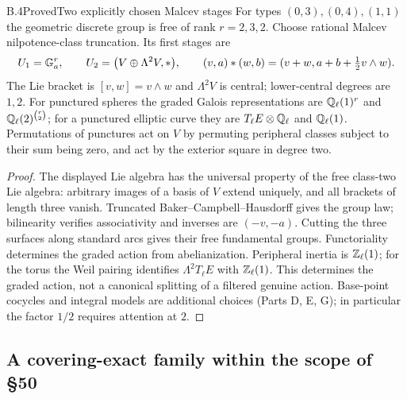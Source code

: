 \begin{statement}{B.4}{Proved}{Two explicitly chosen Malcev stages}
For types $(0,3),(0,4),(1,1)$ the geometric discrete group is
free of rank $r=2,3,2$. Choose rational Malcev nilpotence-class
truncation. Its first stages are
\[
 U_1=\mathbb G_a^r,\qquad
 U_2=\bigl(V\oplus\Lambda^2V,*\bigr),\qquad
 (v,a)*(w,b)=(v+w,a+b+\tfrac12v\wedge w).
\]
The Lie bracket is $[v,w]=v\wedge w$ and $\Lambda^2V$ is central;
lower-central degrees are $1,2$. For punctured spheres the graded
Galois representations are $\mathbb Q_\ell(1)^r$ and
$\mathbb Q_\ell(2)^{\binom r2}$; for a punctured elliptic curve they are
$T_\ell E\otimes\mathbb Q_\ell$ and $\mathbb Q_\ell(1)$. Permutations of punctures
act on $V$ by permuting peripheral classes subject to their sum
being zero, and act by the exterior square in degree two.
\end{statement}
\begin{proof}
The displayed Lie algebra has the universal property of the
free class-two Lie algebra: arbitrary images of a basis of $V$
extend uniquely, and all brackets of length three vanish.
Truncated Baker--Campbell--Hausdorff gives the group law;
bilinearity verifies associativity and inverses are $(-v,-a)$.
Cutting the three surfaces along standard arcs gives their free
fundamental groups. Functoriality determines the graded action
from abelianization. Peripheral inertia is $\mathbb Z_\ell(1)$; for the
torus the Weil pairing identifies $\Lambda^2T_\ell E$ with
$\mathbb Z_\ell(1)$. This determines the graded action, not a canonical
splitting of a filtered genuine action. Base-point cocycles and
integral models are additional choices (Parts D, E, G); in
particular the factor $1/2$ requires attention at $2$.
\end{proof}

\subsection{A covering-exact family within the scope of \S50}

